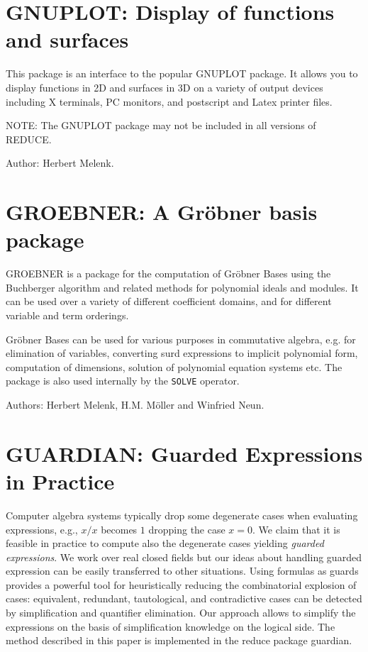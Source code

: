 \section{GNUPLOT: Display of functions and surfaces}

This package is an interface to the popular GNUPLOT package.
It allows you to display functions in 2D and surfaces in 3D
on a variety of output devices including X terminals, PC monitors, and
postscript and Latex printer files.

NOTE: The GNUPLOT package may not be included in all versions of REDUCE.

Author: Herbert Melenk.


\newpage

\section{GROEBNER: A Gr\"obner basis package} 
\label{GROEBNER}

GROEBNER  is a package for the computation of Gr\"obner
Bases using the Buchberger algorithm and related methods
for polynomial ideals and modules.  It can be used over a variety of
different coefficient domains, and for different variable and term
orderings.

Gr\"obner Bases can be used for various purposes in commutative
algebra, e.g. for elimination of variables,
converting surd expressions to implicit polynomial form,
computation of dimensions, solution of polynomial equation systems 
 etc. 
The package is also used internally by the {\tt SOLVE}  
operator.

Authors: Herbert Melenk, H.M. M\"oller and Winfried Neun.


\newpage

\section{GUARDIAN: Guarded Expressions in Practice}
\label{GUARDIAN}

Computer algebra systems typically drop some degenerate cases when
evaluating expressions, e.g., $x/x$ becomes $1$ dropping the case
$x=0$. We claim that it is feasible in practice to compute also the
degenerate cases yielding {\em guarded expressions}. We work over real
closed fields but our ideas about handling guarded expression can be
easily transferred to other situations. Using formulas as guards
provides a powerful tool for heuristically reducing the combinatorial
explosion of cases: equivalent, redundant, tautological, and
contradictive cases can be detected by simplification and quantifier
elimination. Our approach allows to simplify the expressions on the
basis of simplification knowledge on the logical side. The method
described in this paper is implemented in the {\sc reduce} package
{\sc guardian}.

